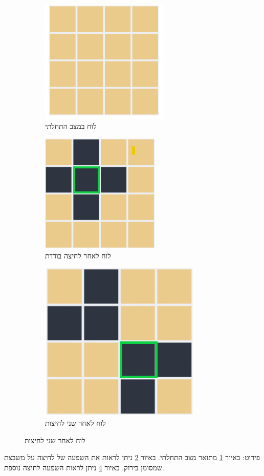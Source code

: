\documentclass[12pt,leqno]{article}
\theoremstyle{theoremdd}
\begin{document}
\begin{figure}[ht]
    \caption{הסבר שינוי מצב הלוח לאחר לחיצה}
    \centering
    \label{fig: explain game}
    \begin{subfigure}{.3\textwidth}
        \caption{לוח במצב התחלתי}
        \label{subfig: explain game, start}
        \centering
        \includegraphics[scale=0.67]{images/4x4_start_board.PNG}
    \end{subfigure}%
    \begin{subfigure}{.3\textwidth}
        \caption{לוח לאחר לחיצה בודדת}
        \label{subfig: explain game, move}
        \centering
        \includegraphics[scale=0.67]{images/4x4_press.PNG}
    \end{subfigure}%
    \begin{subfigure}{.3\textwidth}
        \caption{לוח לאחר שני לחיצות}
        \label{subfig: explain game, next move}
        \centering
        \includegraphics[scale=0.67]{images/4x4_next_press.PNG}
    \end{subfigure}%
\end{figure}
פירוט:
באיור
\ref{subfig: explain game, start}
מתואר מצב התחלתי.
באיור 
\ref{subfig: explain game, move}
ניתן לראות 
את השפעה של לחיצה על משבצת שמסומן בירוק.
באיור
\ref{subfig: explain game, next move}
ניתן לראות השפעה לחיצה נוספת.
\end{document}

